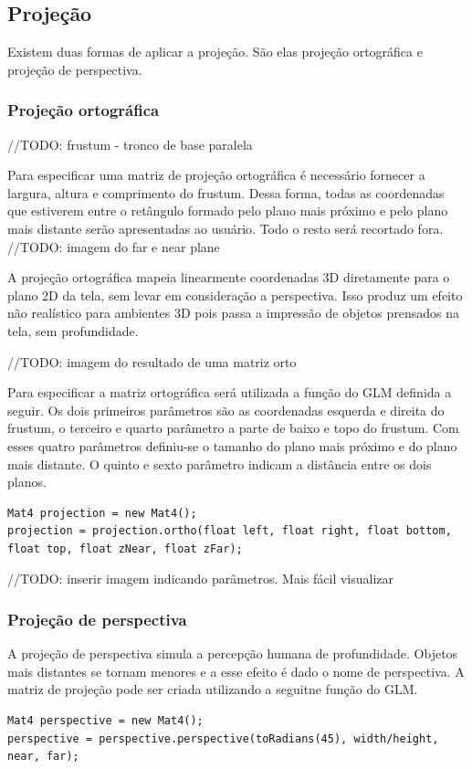 \documentclass[12pt, 
openright, 
oneside, 
a4paper,    
brazil]{facom-ufu-abntex2}
\begin{document}
\subsection{Projeção}

Existem duas formas de aplicar a projeção. São elas projeção ortográfica e projeção de perspectiva.

\subsubsection{Projeção ortográfica}
//TODO: frustum - tronco de base paralela

Para especificar uma matriz de projeção ortográfica é necessário fornecer a largura, altura e comprimento do frustum. Dessa forma, todas as coordenadas que estiverem entre o retângulo formado pelo plano mais próximo e pelo plano mais distante serão apresentadas ao usuário. Todo o resto será recortado fora.
//TODO: imagem do far e near plane

A projeção ortográfica mapeia linearmente coordenadas 3D diretamente para o plano 2D da tela, sem levar em consideração a perspectiva. Isso produz um efeito não realístico para ambientes 3D pois passa a impressão de objetos prensados na tela, sem profundidade.

//TODO: imagem do resultado de uma matriz orto

Para especificar a matriz ortográfica será utilizada a função do GLM definida a seguir. Os dois primeiros parâmetros são as coordenadas esquerda e direita do frustum, o terceiro e quarto parâmetro a parte de baixo e topo do frustum. Com esses quatro parâmetros definiu-se o tamanho do plano mais próximo e do plano mais distante. O quinto e sexto parâmetro indicam a distância entre os dois planos.

\begin{lstlisting}[caption=Função Ortho do GLM]
Mat4 projection = new Mat4();
projection = projection.ortho(float left, float right, float bottom, float top, float zNear, float zFar);
\end{lstlisting}
//TODO: inserir imagem indicando parâmetros. Mais fácil visualizar

\subsubsection{Projeção de perspectiva}
A projeção de perspectiva simula a percepção humana de profundidade. Objetos mais distantes se tornam menores e a esse efeito é dado o nome de perspectiva.
A matriz de projeção pode ser criada utilizando a seguitne função do GLM.
\begin{lstlisting}[caption=Função Perspective do GLM]
Mat4 perspective = new Mat4();
perspective = perspective.perspective(toRadians(45), width/height, near, far);
\end{lstlisting}
\end{document}
